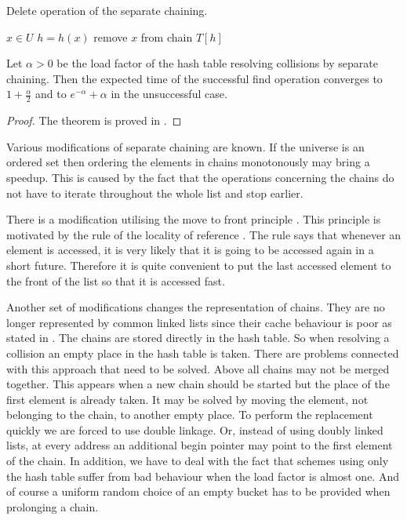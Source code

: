 \begin{algorithm}[ht]
\caption{Delete operation of the separate chaining.}
\label{algorithm-delete-separate-chaining}
\begin{algorithmic}
\REQUIRE $x \in U$
\STATE $h = h(x)$
\STATE
{}
	\STATE remove $x$ from chain $T[h]$
\ENDIF
\end{algorithmic}
\end{algorithm}

\begin{theorem}
Let $\alpha > 0$ be the load factor of the hash table resolving collisions by separate chaining. Then the expected time of the successful find operation converges to $1 + \frac{\alpha}{2}$ and to $e^{-\alpha} + \alpha$ in the unsuccessful case.
\end{theorem}
\begin{proof}
The theorem is proved in \cite{DBLP:books/sp/Mehlhorn84}.
\end{proof}

Various modifications of separate chaining are known. If the universe is an ordered set then ordering the elements in chains monotonously may bring a speedup. This is caused by the fact that the operations concerning the chains do not have to iterate throughout the whole list and stop earlier. 

There is a modification utilising the move to front principle \cite{723912}. This principle is motivated by the rule of the locality of reference \cite{DBLP:books/aw/AhoSU86}. The rule says that whenever an element is accessed, it is very likely that it is going to be accessed again in a short future. Therefore it is quite convenient to put the last accessed element to the front of the list so that it is accessed fast.

Another set of modifications changes the representation of chains. They are no longer represented by common linked lists since their cache behaviour \cite{1200662} is poor as stated in \cite{Rubin99virtualcache}. The chains are stored directly in the hash table. So when resolving a collision an empty place in the hash table is taken. There are problems connected with this approach that need to be solved. Above all chains may not be merged together. This appears when a new chain should be started but the place of the first element is already taken. It may be solved by moving the element, not belonging to the chain, to another empty place. To perform the replacement quickly we are forced to use double linkage. Or, instead of using doubly linked lists, at every address an additional begin pointer may point to the first element of the chain. In addition, we have to deal with the fact that schemes using only the hash table suffer from bad behaviour when the load factor is almost one. And of course a uniform random choice of an empty bucket has to be provided when prolonging a chain.

